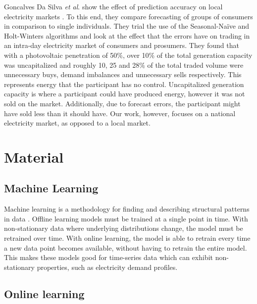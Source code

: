 \documentclass[final,3p,times,twocolumn,numbers]{elsarticle}
\begin{document}
Goncalves Da Silva \textit{et al}. show the effect of prediction accuracy on local electricity markets \cite{GoncalvesDaSilva2014}. To this end, they compare forecasting of groups of consumers in comparison to single individuals. They trial the use of the Seasonal-Naïve and Holt-Winters algorithms and look at the effect that the errors have on trading in an intra-day electricity market of consumers and prosumers. They found that with a photovoltaic penetration of 50\%, over 10\% of the total generation capacity was uncapitalized and roughly 10, 25 and 28\% of the total traded volume were unnecessary buys, demand imbalances and unnecessary sells respectively. This represents energy that the participant has no control. Uncapitalized generation capacity is where a participant could have produced energy, however it was not sold on the market. Additionally, due to forecast errors, the participant might have sold less than it should have. Our work, however, focuses on a national electricity market, as opposed to a local market.





\section{Material}
\label{sec:material}

\subsection{Machine Learning}

Machine learning is a methodology for finding and describing structural patterns in data \cite{Witten2011}. Offline learning models must be trained at a single point in time. With non-stationary data where underlying distributions change, the model must be retrained over time. With online learning, the model is able to retrain every time a new data point becomes available, without having to retrain the entire model. This makes these models good for time-series data which can exhibit non-stationary properties, such as electricity demand profiles.





\subsection{Online learning}

\end{document}
